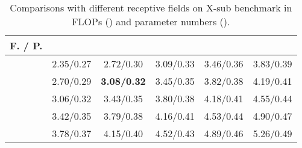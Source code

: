\documentclass[10pt,journal,compsoc]{IEEEtran}
\begin{document}
\begin{table}[ht]
  \vspace{-0.4cm}
  \caption{Comparisons with different receptive fields on X-sub benchmark in FLOPs () and parameter numbers ().}
  \label{tab:receptive_complexity}
  \vspace{-0.4cm}
  \centering
  \setlength{\tabcolsep}{4pt}
  \renewcommand{\arraystretch}{1.2}
  \begin{tabular}{c|ccccc}
  \toprule
  F. / P.&  &  &  &  &  \\
  \midrule
   & 2.35/0.27 & 2.72/0.30 & 3.09/0.33 & 3.46/0.36 & 3.83/0.39 \\
   & 2.70/0.29 & {\bf 3.08/0.32} & 3.45/0.35 & 3.82/0.38 & 4.19/0.41 \\
   & 3.06/0.32 & 3.43/0.35 & 3.80/0.38 & 4.18/0.41 & 4.55/0.44 \\
   & 3.42/0.35 & 3.79/0.38 & 4.16/0.41 & 4.53/0.44 & 4.90/0.47 \\
   & 3.78/0.37 & 4.15/0.40 & 4.52/0.43 & 4.89/0.46 & 5.26/0.49 \\
  \bottomrule
  \end{tabular}
\end{table}
\end{document}
